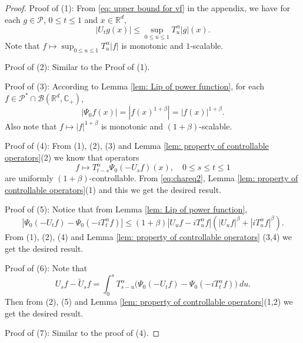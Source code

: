 \documentclass[12pt]{amsart}
\theoremstyle{plain}
\theoremstyle{definition}
\numberwithin{equation}{section}
\begin{document}
\begin{proof}
    Proof of (1): From \eqref{eq: upper bound for vf} in the appendix, we have for each $g\in \mathcal P$, $0\leq t\leq 1$ and $x\in \mathbb R^d$,
\[
    |U_t g(x)|
    \leq \sup_{0\leq u\leq 1}T_u^\alpha |g| (x).
\]
    Note that $f\mapsto\sup_{0\leq u\leq 1}T^{\alpha}_u|f|$ is monotonic and $1$-scalable.

    Proof of (2): Similar to the Proof of (1).

    Proof of (3): According to Lemma \ref{lem: Lip of power function}, for each $f\in \mathcal P^* \cap \mathcal B(\mathbb R^d, \mathbb C_+)$,
\[
    |\Psi_0 f(x)| = |f(x)^{1+\beta}| = |f(x)|^{1+\beta}.
\]
    Also note that $f\mapsto |f|^{1+\beta}$ is monotonic and $(1+\beta)$-scalable.

    Proof of (4): From (1), (2), (3) and Lemma \ref{lem: property of controllable operators}(2) we know that operators
\[
    f
    \mapsto T^{\alpha}_{t-s}\Psi_0(-U_sf)(x),
    \quad 0\leq s\leq t\leq 1
\]
    are uniformly $(1+\beta)$-controllable.
    From \eqref{eq:chareq2}, Lemma \ref{lem: property of controllable operators}(1) and this we get the desired result.

    Proof of (5): Notice that from Lemma \ref{lem: Lip of power function},
\[
    |\Psi_0(-U_t f) - \Psi_0(-iT_t^\alpha f) |
    \leq  (1+\beta) |U_u f-iT_u^{\alpha}f|(|U_u f|^{\beta}+|i T_u^{\alpha}f|^{\beta}).
\]
    From (1), (2), (4) and Lemma \ref{lem: property of controllable operators} (3,4) we get the desired result.

    Proof of (6): Note that
\[
    U_sf - \tilde U_sf
    = \int_0^s T_{s-u}^{\alpha}\big(\Psi_0(-U_t f)-\Psi_0(-i T_t^{\alpha}f)\big)~du.
\]
    Then from (2), (5) and Lemma \ref{lem: property of controllable operators}(1,2) we get the desired result.

    Proof of (7): Similar to the proof of (4).
\end{proof}
\end{document}
